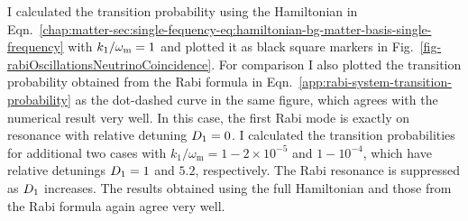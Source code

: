 

I calculated the transition probability using the Hamiltonian in Eqn.~\eqref{chap:matter-sec:single-fequency-eq:hamiltonian-bg-matter-basis-single-frequency} with $k_1/\omega_\mathrm m=1$ and plotted it as black square markers in Fig.~\ref{fig-rabiOscillationsNeutrinoCoincidence}. For comparison I also plotted the transition probability obtained from the Rabi formula in Eqn.~\eqref{app:rabi-system-transition-probability} as the dot-dashed curve in the same figure, which agrees with the numerical result very well. In this case, the first Rabi mode is exactly on resonance with relative detuning $D_1=0$. I calculated the transition probabilities for additional two cases with $k_1/\omega_\mathrm{m}=1-2\times 10^{-5}$ and $1-10^{-4}$, which have relative detunings $D_1 = 1$ and $5.2$, respectively. The Rabi resonance is suppressed as $D_1$ increases. The results obtained using the full Hamiltonian and those from the Rabi formula again agree very well.

